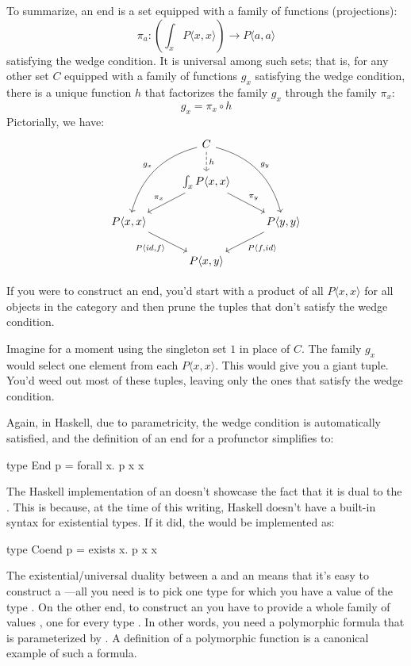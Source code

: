 \documentclass[DaoFP]{subfiles}
\begin{document}
To summarize, an end is a set equipped with a family of functions (projections):
\[ \pi_a \colon \left( \int_x P \langle x, x \rangle \right) \to P \langle a, a \rangle \]
satisfying the wedge condition. It is universal among such sets; that is, for any other set $C$ equipped with a family of functions $g_x$ satisfying the wedge condition, there is a unique function $h$ that factorizes the family $g_x$ through the family $\pi_x$:
\[ g_x = \pi_x \circ h \]
Pictorially, we have:
\[
 \begin{tikzcd}
 &C
 \arrow[ddl, bend right, "g_x"']
 \arrow[ddr, bend left, "g_y"]
 \arrow[d, dashed, "h"]
 \\
 & \int_x P \langle x, x \rangle
 \arrow[ld, "\pi_x"']
 \arrow[rd, "\pi_y"]
 \\
 P \langle x, x \rangle
 \arrow[dr, "{P \langle id, f \rangle}"']
 &&P \langle y, y \rangle
 \arrow[dl, "{P \langle f, id \rangle}"]
 \\
 & P \langle x, y \rangle
 \end{tikzcd}
\]

If you were to construct an end, you'd start with a product of all $P \langle x, x \rangle$ for all objects in the category and then prune the tuples that don't satisfy the wedge condition. 

Imagine for a moment using the singleton set $1$ in place of $C$. The family $g_x$ would select one element from each $P \langle x, x \rangle$. This would give you a giant tuple. You'd weed out most of these tuples, leaving only the ones that satisfy the wedge condition. 

Again, in Haskell, due to parametricity, the wedge condition is automatically satisfied, and the definition of an end for a profunctor  simplifies to:

\begin{haskell}
type End p = forall x. p x x
\end{haskell}

The Haskell implementation of an  doesn't showcase the fact that it is dual to the . This is because, at the time of this writing, Haskell doesn't have a built-in syntax for existential types. If it did, the  would be implemented as:
\begin{haskell}
type Coend p = exists x. p x x
\end{haskell}

The existential/universal duality between a  and an  means that it's easy to construct a ---all you need is to pick one type  for which you have a value of the type . On the other end, to construct an  you have to provide a whole family of values , one for every type . In other words, you need a polymorphic formula that is parameterized by . A definition of a polymorphic function is a canonical example of such a formula.
\end{document}
